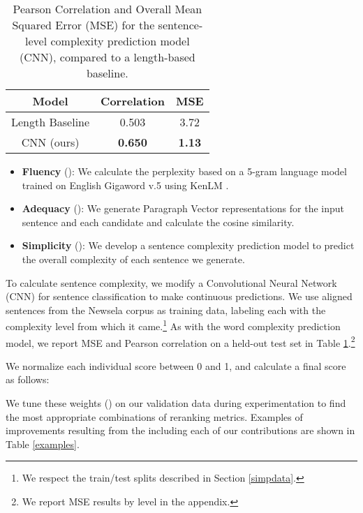 \documentclass[11pt,a4paper]{article}
\begin{document}
\begin{table}
\begin{center}
\begin{tabular}{|c|c|c|} \hline
\textbf{Model} & \textbf{Correlation} & \textbf{MSE} \\ \hline
Length Baseline & 0.503 & 3.72 \\
CNN (ours) & \textbf{0.650} & \textbf{1.13} \\ \hline
\end{tabular}
\end{center}
\caption{\label{sent-comp-table} Pearson Correlation and Overall Mean Squared Error (MSE) for the sentence-level complexity prediction model (CNN), compared to a length-based baseline.}
\end{table}

\begin{itemize}
    \item \textbf{Fluency} (): We calculate the perplexity based on a 5-gram language model trained on English Gigaword v.5 \cite{parker2011english} using KenLM \cite{heafield2011kenlm}.
    \item \textbf{Adequacy} (): We generate Paragraph Vector representations \cite{le2014distributed} for the input sentence and each candidate and calculate the cosine similarity.
    \item \textbf{Simplicity} (): We develop a sentence complexity prediction model to predict the overall complexity of each sentence we generate.
\end{itemize}

To calculate sentence complexity, we modify a Convolutional Neural Network (CNN) for sentence classification \cite{kim2014convolutional} to make continuous predictions. We use aligned sentences from the Newsela corpus \cite{xu2015problems} as training data, labeling each with the complexity level from which it came.\footnote{We respect the train/test splits described in Section \ref{simpdata}.} As with the word complexity prediction model, we report MSE and Pearson correlation on a held-out test set in Table \ref{sent-comp-table}.\footnote{We report MSE results by level in the appendix.}

We normalize each individual score between 0 and 1, and calculate a final score as follows:



\noindent We tune these weights (\textbf{}) on our validation data during experimentation to find the most appropriate combinations of reranking metrics. Examples of improvements resulting from the including each of our contributions are shown in Table \ref{examples}.
\end{document}
